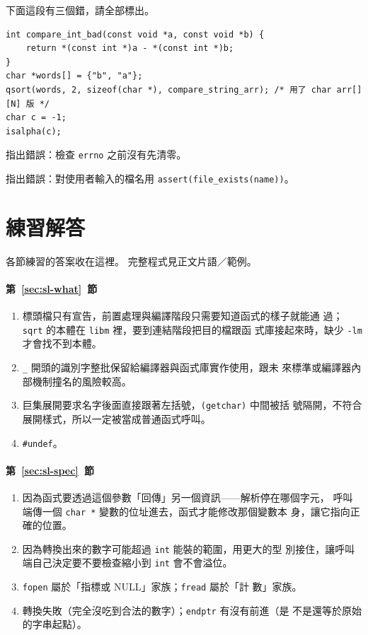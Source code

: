 \begin{drills}[label=drills:sl-checklist]
\item 下面這段有三個錯，請全部標出。
\begin{verbatim}
int compare_int_bad(const void *a, const void *b) {
    return *(const int *)a - *(const int *)b;
}
char *words[] = {"b", "a"};
qsort(words, 2, sizeof(char *), compare_string_arr); /* 用了 char arr[][N] 版 */
char c = -1;
isalpha(c);
\end{verbatim}
\item 指出錯誤：檢查 \texttt{errno} 之前沒有先清零。
\item 指出錯誤：對使用者輸入的檔名用 \texttt{assert(file\_exists(name))}。
\end{drills}

{}
\section*{練習解答}

各節練習的答案收在這裡。 完整程式見正文片語／範例。

\paragraph{第~\ref{sec:sl-what}~節}
\begin{enumerate}
\item 標頭檔只有宣告，前置處理與編譯階段只需要知道函式的樣子就能通
過；\texttt{sqrt} 的本體在 \texttt{libm} 裡，要到連結階段把目的檔跟函
式庫接起來時，缺少 \texttt{-lm} 才會找不到本體。
\item \texttt{\_} 開頭的識別字整批保留給編譯器與函式庫實作使用，跟未
來標準或編譯器內部機制撞名的風險較高。
\item 巨集展開要求名字後面直接跟著左括號，\texttt{(getchar)} 中間被括
號隔開，不符合展開樣式，所以一定被當成普通函式呼叫。
\item \texttt{\#undef}。
\end{enumerate}

\paragraph{第~\ref{sec:sl-spec}~節}
\begin{enumerate}
\item 因為函式要透過這個參數「回傳」另一個資訊——解析停在哪個字元，
呼叫端傳一個 \texttt{char *} 變數的位址進去，函式才能修改那個變數本
身，讓它指向正確的位置。
\item 因為轉換出來的數字可能超過 \texttt{int} 能裝的範圍，用更大的型
別接住，讓呼叫端自己決定要不要檢查縮小到 \texttt{int} 會不會溢位。
\item \texttt{fopen} 屬於「指標或 NULL」家族；\texttt{fread} 屬於「計
數」家族。
\item 轉換失敗（完全沒吃到合法的數字）；\texttt{endptr} 有沒有前進（是
不是還等於原始的字串起點）。
\end{enumerate}


